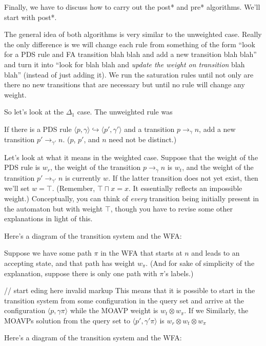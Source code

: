 \documentclass{article}
\newcommand{\Config}[2]{\ensuremath{\langle #1, #2 \rangle}}
\newcommand{\Rule}[2]{\ensuremath{#1 \hookrightarrow #2}}
\newcommand{\Trans}[3]{\ensuremath{#1 \rightarrow_{#2} #3}}
\newcommand{\meet}{\sqcap}
\newcommand{\extend}{\otimes}
\begin{document}
Finally, we have to discuss how to carry out the post* and pre*
algorithms. We'll start with post*.

The general idea of both algorithms is very similar to the unweighted
case. Really the only difference is we will change each rule from
something of the form ``look for a PDS rule and FA transition blah
blah and add a new transition blah blah'' and turn it into ``look for
blah blah and \emph{update the weight on transition} blah blah''
(instead of just adding it). We run the saturation rules until not
only are there no new transitions that are necessary but until no rule
will change any weight.

So let's look at the $\Delta_1$ case. The unweighted rule was

   If there is a PDS rule
   \Rule{\Config{p}{\gamma}}{\Config{p'}{\gamma'}} and a transition
   \Trans{p}{\gamma}{n}, add a new transition
   \Trans{p'}{\gamma'}{n}. ($p$, $p'$, and $n$ need not be distinct.)

Let's look at what it means in the weighted case. Suppose that the
weight of the PDS rule is $w_r$, the weight of the transition
\Trans{p}{\gamma}{n} is $w_t$, and the weight of the transition
\Trans{p'}{\gamma'}{n} is currently $w$. If the latter transition does
not yet exist, then we'll set $w = \top$. (Remember, $\top \meet x =
x$. It essentially reflects an impossible weight.) Conceptually, you
can think of \emph{every} transition being initially present in the
automaton but with weight $\top$, though you have to revise some other
explanations in light of this.

Here's a diagram of the transition system and the WFA:

Suppose we have some path $\pi$ in the WFA that starts at $n$ and
leads to an accepting state, and that path has weight $w_\pi$. (And
for sake of simplicity of the explanation, suppose there is only one
path with $\pi$'s labels.)

// start eding here invalid markup
This means that it is possible to start in the transition system from some
  configuration in the query set and arrive at the configuration
  \Config{p}{\gamma \pi} while the MOAVP weight is $w_t \extend
  w_\pi$.\footnotemark
If we Similarly, the MOAVPs solution from the query set to
  \Config{p'}{\gamma'\pi} is $w_r \extend w_t \extend w_\pi$



Here's a diagram of the transition system and the WFA:
\end{document}
